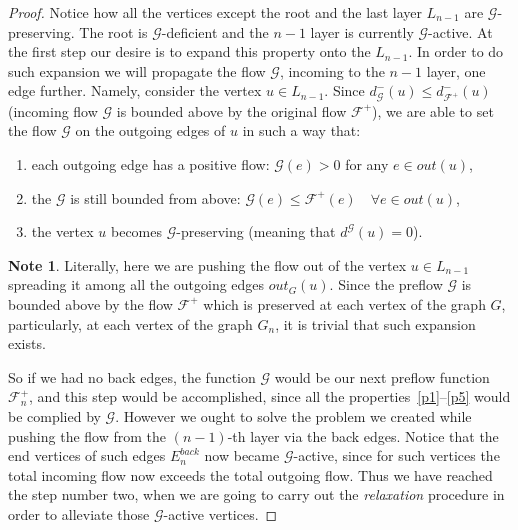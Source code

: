 \documentclass[12pt]{article}
\renewcommand{\cal}[1]{\mathcal{#1}}
\renewcommand{\leq}{\leqslant}
\theoremstyle{definition}
\newtheorem*{note}{Note}
\newcommand{\flowpos}{\mathcal{F}^{+}}
\newcommand{\flowposn}[1]{\mathcal{F}_{#1}^{+}}
\newcommand{\eout}{out}
\newcommand{\eback}{E^{back}}
\numberwithin{remark}{section}
\numberwithin{theorem}{section}
\numberwithin{prop}{section}
\numberwithin{equation}{section}
\numberwithin{lemma}{section}
\numberwithin{prop_under_lemma}{lemma}
\begin{document}
\begin{proof}
      Notice how all the vertices except the root and the last layer $L_{n-1}$ are $\cal{G}$-preserving.
      The root is $\cal{G}$-deficient and the $n-1$ layer is currently $\cal{G}$-active.
      At the first step our desire is to expand this property onto the $L_{n-1}$.
      In order to do such expansion we will propagate the flow $\cal{G}$, incoming to the $n-1$ layer, one edge further.
      Namely, consider the vertex $u \in L_{n-1}$.
      Since $d_{\cal{G}}^{-}(u) \leq d_{\flowpos}^{-}(u)$ (incoming flow $\cal{G}$ is bounded above by the original flow $\flowpos$),
        we are able to set the flow $\cal{G}$ on the outgoing edges of $u$ in such a way that:
      \begin{enumerate}[label=\textbf{(\roman*)}]
        \item\label{posprop} each outgoing edge has a positive flow: $\cal{G}(e) > 0$ for any $e \in \eout(u)$,
        \item the $\cal{G}$ is still bounded from above: 
          $\cal{G}(e) \leq \flowpos(e) \quad \forall e \in \eout(u)$,
        \item the vertex $u$ becomes $\cal{G}$-preserving (meaning that $d^{\cal{G}}(u) = 0$).
      \end{enumerate}
      \begin{note}
        Literally, here we are pushing the flow out of the vertex $u \in L_{n-1}$ spreading it among all the outgoing edges
          $\eout_G(u)$.
        Since the preflow $\cal{G}$ is bounded above by the flow $\flowpos$ which is preserved at each vertex of the graph $G$,
          particularly, at each vertex of the graph $G_n$, it is trivial that such expansion exists.
      \end{note}
      So if we had no back edges, the function $\cal{G}$ would be our next preflow function $\flowposn{n}$, and this step would be accomplished,
        since all the properties~\ref{p1}--\ref{p5} would be complied by $\cal{G}$.
      However we ought to solve the problem we created while pushing the flow from the $(n-1)$-th layer via the back edges.
      Notice that the end vertices of such edges $\eback_{n}$ now became $\cal{G}$-active, since for such vertices
        the total incoming flow now exceeds the total outgoing flow.
      Thus we have reached the step number two, when we are going to carry out the \emph{relaxation} procedure in order to alleviate those $\cal{G}$-active
        vertices.


\end{proof}
\end{document}
